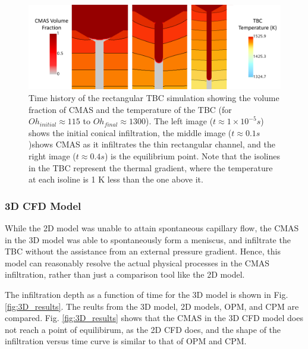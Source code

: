 \documentclass[%
 aip,
 amsmath,amssymb,
 reprint,%
floatfix]{revtex4-1}
\begin{document}
\begin{figure}
    \centering
    \includegraphics[width=\linewidth]{Figures/rect_timeHistory.png}
    \caption{Time history of the rectangular TBC simulation showing the volume fraction of CMAS and the temperature of the TBC (for $Oh_{initial} \approx 115$ to $Oh_{final} \approx 1300$). The left image ($t \approx 1\times 10^{-5}s$) shows the initial conical infiltration, the middle image ($t \approx 0.1 s$)shows CMAS as it infiltrates the thin rectangular channel, and the right image ($t \approx 0.4 s$) is the equilibrium point. Note that the isolines in the TBC represent the thermal gradient, where the temperature at each isoline is 1 K less than the one above it.}
    \label{fig:rect_timehistory}
\end{figure}




\subsubsection{3D CFD Model}

While the 2D model was unable to attain spontaneous capillary flow, the CMAS in the 3D model was able to spontaneously form a meniscus, and infiltrate the TBC without the assistance from an external pressure gradient. Hence, this model can reasonably resolve the actual physical processes in the CMAS infiltration, rather than just a comparison tool like the 2D model. 

The infiltration depth as a function of time for the 3D model is shown in Fig. \ref{fig:3D_results}. The reults from the 3D model, 2D models, OPM, and CPM are compared. Fig. \ref{fig:3D_results} shows that the CMAS in the 3D CFD model does not reach a point of equilibirum, as the 2D CFD does, and the shape of the infiltration versus time curve is similar to that of OPM and CPM. 
\end{document}
